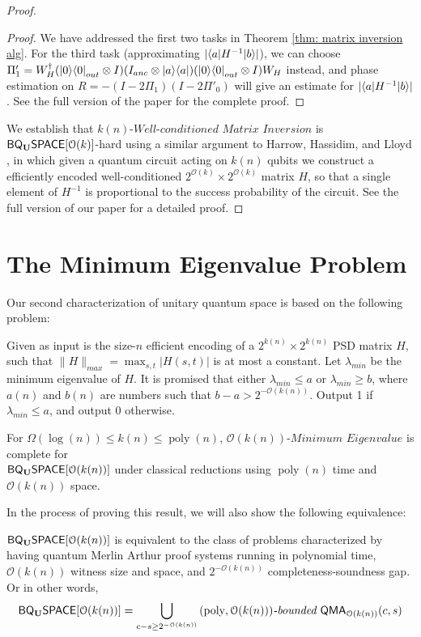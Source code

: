 \documentclass[a4paper,UKenglish]{lipics-v2016}
\newcommand\QMA{{\sf{QMA}}}
\newcommand\bddQMA[5]{{\left(#1,#2\right)}\textit{-bounded }\QMA_{#3}(#4,#5)}
\newcommand\matrixinvert[1]{{\ensuremath{#1}}\textit{-Well-conditioned Matrix Inversion}}
\newcommand\spechamiltonian[1]{\ensuremath{#1}\textit{-Minimum Eigenvalue}}
\newcommand{\classfont}{\sf}
\newcommand{\Unitary}{\mathbf{U}}
\newcommand{\unitaryBQSPACE}[1]{{\classfont{BQ}_\Unitary\classfont{SPACE}}[#1]}
\newcommand\bigoh{\mathcal{O}}
\DeclareMathOperator{\poly}{poly}
\begin{document}
\begin{proof}
\begin{proof}
We have addressed the first two tasks in Theorem \ref{thm: matrix inversion alg}. For the third task (approximating $|{\left\langle{a}\right\vert}H^{-1}{\left\vert{b}\right\rangle}|$), we can choose $\Pi'_1 = W_H^\dagger ({\left\vert{0}\right\rangle}{\left\langle{0}\right\vert}_{out} \otimes I) (I_{anc} \otimes {\left\vert{a}\right\rangle}{\left\langle{a}\right\vert})({\left\vert{0}\right\rangle}{\left\langle{0}\right\vert}_{out} \otimes I) W_H$ instead, and phase estimation on $R=-(I-2\Pi_1)(I-2\Pi'_0)$ will give an estimate for $|{\left\langle{a}\right\vert}H^{-1}{\left\vert{b}\right\rangle}|$. See the full version of the paper for the complete proof.
\end{proof}
We establish that $\matrixinvert{k(n)}$ is $\unitaryBQSPACE{\mathcal{O}(k)}$-hard using a similar argument to Harrow, Hassidim, and Lloyd \cite{HHL}, in which given a quantum circuit acting on $k(n)$ qubits we 
construct a efficiently encoded well-conditioned $2^{\mathcal{O}(k)}\times 2^{\mathcal{O}(k)}$ matrix $H$, so that a single element of $H^{-1}$ is proportional to the success probability of the circuit.  See the full version of our paper for a detailed proof.
\end{proof}

\section{The Minimum Eigenvalue Problem} \label{sec: Minimum Eigenvalue}
Our second characterization of unitary quantum space is based on the following problem:
\begin{definition}[$\spechamiltonian{k(n)}$ problem] \label{def: spechamiltonian}
Given as input is the size-$n$ efficient encoding of a $2^{k(n)} \times 2^{k(n)}$ PSD matrix $H$, such that 
$\|H\|_{max} = \max_{s,t}|H(s,t)|$ is at most a constant. Let $\lambda_{min}$ be the minimum eigenvalue of $H$. It is promised that either $\lambda_{min} \le a$ or $\lambda_{min} \ge b$, where $a(n)$ and $b(n)$ are numbers such that $b-a > 2^{-\mathcal{O}(k(n))}$. Output 1 if $\lambda_{min} \le a$, and output 0 otherwise.
\end{definition}

\begin{theorem} \label{thm: spechamiltonian}
For $\Omega(\log(n)) \le k(n) \le \poly(n)$, $\spechamiltonian{\mathcal{O}(k(n))}$ is complete for \\ $\unitaryBQSPACE{\mathcal{O}(k(n))}$ under classical reductions using $\poly(n)$ time and $\mathcal{O}(k(n))$ space.
\end{theorem}

In the process of proving this result, we will also show the following equivalence:
\begin{theorem} \label{thm: equivalence}
$\unitaryBQSPACE{\mathcal{O}(k(n))}$ is equivalent to the class of problems characterized by having quantum Merlin Arthur proof systems running in polynomial time, $\mathcal{O}(k(n))$ witness size and space, and $2^{-\mathcal{O}(k(n))}$ completeness-soundness gap. Or in other words,
\begin{equation}
\unitaryBQSPACE{\mathcal{O}(k(n))}= \bigcup_{c - s \ge 2^{-\bigoh(k(n))}}\bddQMA{\poly}{\bigoh(k(n))}{\bigoh(k(n))}{c}{s} \nonumber
\end{equation}
\end{theorem}
\end{document}
